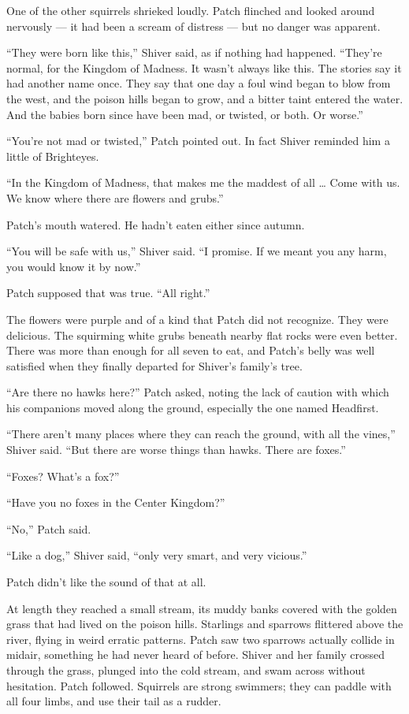 \documentclass[ebook,oneside,openany,12pt]{memoir}
\begin{document}
One of the other squirrels shrieked loudly. Patch flinched and looked
around nervously — it had been a scream of distress — but no danger
was apparent.

“They were born like this,” Shiver said, as if nothing had
happened. “They’re normal, for the Kingdom of Madness. It wasn’t
always like this. The stories say it had another name once. They say
that one day a foul wind began to blow from the west, and the poison
hills began to grow, and a bitter taint entered the water. And the
babies born since have been mad, or twisted, or both. Or worse.”

“You’re not mad or twisted,” Patch pointed out. In fact Shiver
reminded him a little of Brighteyes.

“In the Kingdom of Madness, that makes me the maddest of all … Come
with us. We know where there are flowers and grubs.”

Patch’s mouth watered. He hadn’t eaten either since autumn.

“You will be safe with us,” Shiver said. “I promise. If we meant you
any harm, you would know it by now.”

Patch supposed that was true. “All right.”

The flowers were purple and of a kind that Patch did not
recognize. They were delicious. The squirming white grubs beneath
nearby flat rocks were even better. There was more than enough for all
seven to eat, and Patch’s belly was well satisfied when they finally
departed for Shiver’s family’s tree.

“Are there no hawks here?” Patch asked, noting the lack of caution
with which his companions moved along the ground, especially the one
named Headfirst.

“There aren’t many places where they can reach the ground, with all
the vines,” Shiver said. “But there are worse things than hawks. There
are foxes.”

“Foxes? What’s a fox?”

“Have you no foxes in the Center Kingdom?”

“No,” Patch said.

“Like a dog,” Shiver said, “only very smart, and very vicious.”

Patch didn’t like the sound of that at all.

At length they reached a small stream, its muddy banks covered with
the golden grass that had lived on the poison hills. Starlings and
sparrows flittered above the river, flying in weird erratic
patterns. Patch saw two sparrows actually collide in midair, something
he had never heard of before. Shiver and her family crossed through
the grass, plunged into the cold stream, and swam across without
hesitation. Patch followed. Squirrels are strong swimmers; they can
paddle with all four limbs, and use their tail as a rudder.
\end{document}
